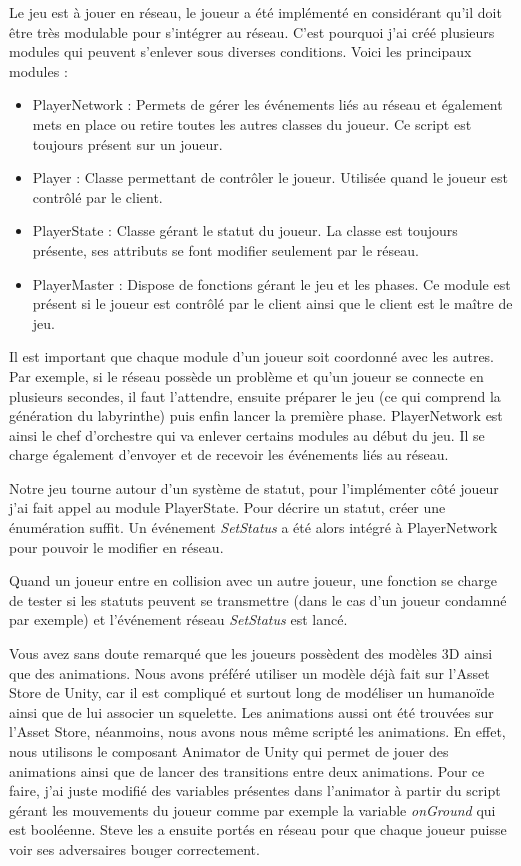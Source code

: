 \documentclass{article}
\begin{document}
Le jeu est à jouer en réseau, le joueur a été implémenté en considérant qu'il doit être très modulable pour s'intégrer au réseau.
C'est pourquoi j'ai créé plusieurs modules qui peuvent s'enlever sous diverses conditions.
Voici les principaux modules :


\begin{itemize}
\item PlayerNetwork : Permets de gérer les événements liés au réseau et également
mets en place ou retire toutes les autres classes du joueur. Ce script est
toujours présent sur un joueur.
\item Player : Classe permettant de contrôler le joueur. Utilisée quand le joueur
est contrôlé par le client.
\item PlayerState : Classe gérant le statut du joueur. La classe est toujours
présente, ses attributs se font modifier seulement par le réseau.
\item PlayerMaster : Dispose de fonctions gérant le jeu et les phases. Ce module
est présent si le joueur est contrôlé par le client ainsi que le client est le
maître de jeu.
\end{itemize}


Il est important que chaque module d'un joueur soit coordonné avec les autres. Par exemple, si le réseau possède un problème et qu'un joueur se connecte en plusieurs secondes, il faut l'attendre, ensuite préparer le jeu (ce qui comprend la génération du labyrinthe) puis enfin lancer la première phase. PlayerNetwork est ainsi le chef d'orchestre qui va enlever certains modules au début du jeu. Il se charge également d'envoyer et de recevoir les événements liés au réseau.


Notre jeu tourne autour d'un système de statut, pour l'implémenter côté joueur j'ai fait appel au module PlayerState.
Pour décrire un statut, créer une énumération suffit. Un événement \emph{SetStatus} a été alors intégré à PlayerNetwork pour pouvoir le modifier en réseau.


Quand un joueur entre en collision avec un autre joueur, une fonction se charge de tester si les statuts peuvent se transmettre (dans le cas d'un joueur condamné par exemple) et l'événement réseau \emph{SetStatus} est lancé.


Vous avez sans doute remarqué que les joueurs possèdent des modèles 3D ainsi que des animations.
Nous avons préféré utiliser un modèle déjà fait sur l'Asset Store de Unity, car il est compliqué et surtout long de modéliser un humanoïde ainsi que de lui associer un squelette. Les animations aussi ont été trouvées sur l'Asset Store, néanmoins, nous avons nous même scripté les animations. En effet, nous utilisons le composant Animator de Unity qui permet de jouer des animations ainsi que de lancer des transitions entre deux animations. Pour ce faire, j'ai juste modifié des variables présentes dans l'animator à partir du script gérant les mouvements du joueur comme par exemple la variable \emph{onGround} qui est booléenne. Steve les a ensuite portés en réseau pour que chaque joueur puisse voir ses adversaires bouger correctement.
\end{document}
